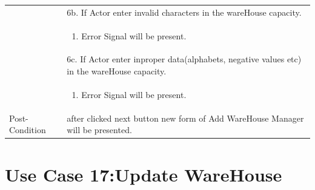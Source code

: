 \documentclass[12pt,a4paper]{article}
\begin{document}
\begin{longtable}{| p{3cm}|p{12cm}|}
& 6b. If Actor enter invalid characters in the wareHouse capacity. \\
& \begin{enumerate}
		\item Error Signal will be present.
	\end{enumerate}
\\ 
& 6c. If Actor enter inproper data(alphabets, negative values etc) in the wareHouse capacity. \\
& \begin{enumerate}
		\item Error Signal will be present.
	\end{enumerate}


\\ \hline 


Post-Condition &  after clicked next button new form of Add WareHouse Manager will be presented.  \\ \hline


\end{longtable}

\section*{Use Case 17:Update WareHouse}
\end{document}
